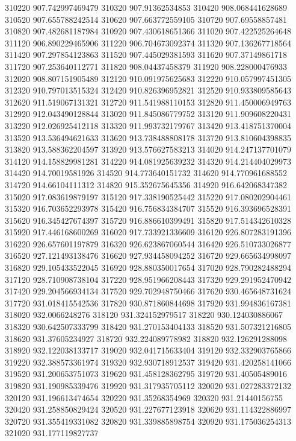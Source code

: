 {310220 907.742997469479
310320 907.91362534853
310420 908.068441628689
310520 907.655788242514
310620 907.663772559105
310720 907.69558857481
310820 907.482681187984
310920 907.430618651366
311020 907.422525264648
311120 906.890229465906
311220 906.704673092374
311320 907.136267718564
311420 907.297854123863
311520 907.445029381593
311620 907.37149861718
311720 907.253640112771
311820 908.04437458379
311920 908.228000476933
312020 908.807151905489
312120 910.091975625683
312220 910.057997451305
312320 910.797013515324
312420 910.826396952821
312520 910.933809585643
312620 911.519067131321
312720 911.541988110153
312820 911.450006949763
312920 912.043490128844
313020 911.845086779752
313120 911.909608220431
313220 912.026925412118
313320 911.993732179767
313420 913.418751370004
313520 913.536494621633
313620 913.738488808178
313720 913.810604398835
313820 913.588362204597
313920 913.576627583213
314020 914.247137701079
314120 914.158829981281
314220 914.081925639232
314320 914.214404029973
314420 914.70019581926
314520 914.773640151732
314620 914.770961688552
314720 914.66104111312
314820 915.352675645356
314920 916.642068347382
315020 917.083619879197
315120 917.338190525442
315220 917.080202904461
315320 916.703652293978
315420 916.756834384707
315520 916.393696528391
315620 916.345427674397
315720 916.886610399491
315820 917.514342610328
315920 917.446168600269
316020 917.733921336609
316120 926.807283191396
316220 926.657601197879
316320 926.623867060544
316420 926.510733026877
316520 927.121493138476
316620 927.934458094252
316720 929.665634998097
316820 929.105433522045
316920 928.880350017654
317020 928.790282488294
317120 928.710908738104
317220 928.951966208443
317320 929.291952470942
317420 929.204566934134
317520 929.702948750466
317620 930.465648731624
317720 931.018415542536
317820 930.871860844698
317920 931.994836167381
318020 932.0066248276
318120 931.324152979517
318220 930.124030886067
318320 930.642507333799
318420 931.270153404133
318520 931.507321216805
318620 931.37605234927
318720 932.224089778982
318820 932.126291288098
318920 932.122038133717
319020 932.041715633404
319120 932.332903765866
319220 932.388573361974
319320 932.930718912537
319420 931.420258141066
319520 931.200653751073
319620 931.458128362795
319720 931.40505489016
319820 931.190985339476
319920 931.317935705112
320020 931.027283372132
320120 931.196613474654
320220 931.35268354969
320320 931.21440156755
320420 931.258850829424
320520 931.227677123918
320620 931.114322886997
320720 931.355419331082
320820 931.339885898754
320920 931.175036254313
321020 931.177119827737
}
